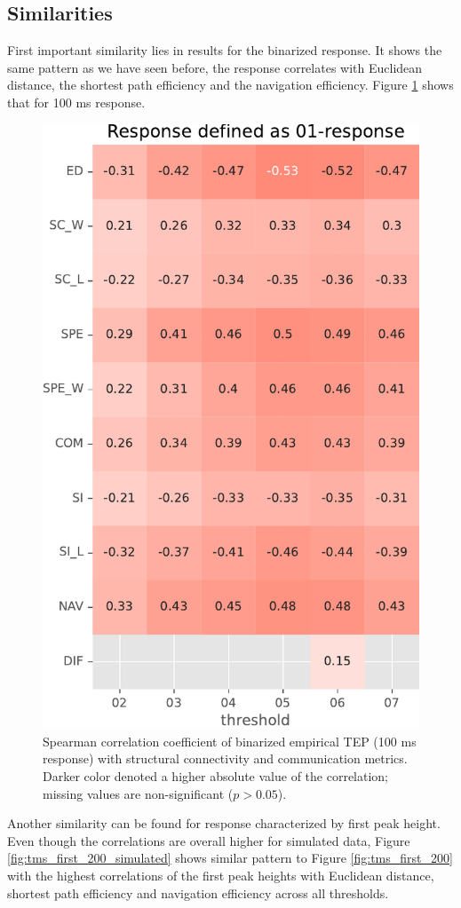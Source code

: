 \subsection{Similarities}

First important similarity lies in results for the binarized response. It shows the same pattern as we have seen before, the response correlates with Euclidean distance, the shortest path efficiency and the navigation efficiency. Figure \ref{fig:tms_binary_100_simulated} shows that for 100 ms response. 

\begin{figure}
    \centering
    \includegraphics[height=\textwidth]{images/nootebook_generated/pytepfit_results/simulated/100/not_over_threshold_nan/Response defined as 01-response.pdf}
    \caption[Binarized TEP (100 ms) correlations (simualted data)]{Spearman correlation coefficient of binarized empirical TEP (100 ms response) with structural connectivity and communication metrics. Darker color denoted a higher absolute value of the correlation; missing values are non-significant ($p>0.05$).}
    \label{fig:tms_binary_100_simulated}
\end{figure}

Another similarity can be found for response characterized by first peak height. Even though the correlations are overall higher for simulated data, Figure \ref{fig:tms_first_200_simulated} shows similar pattern to Figure \ref{fig:tms_first_200} with the highest correlations of the first peak heights with Euclidean distance, shortest path efficiency and navigation efficiency across all thresholds. 

